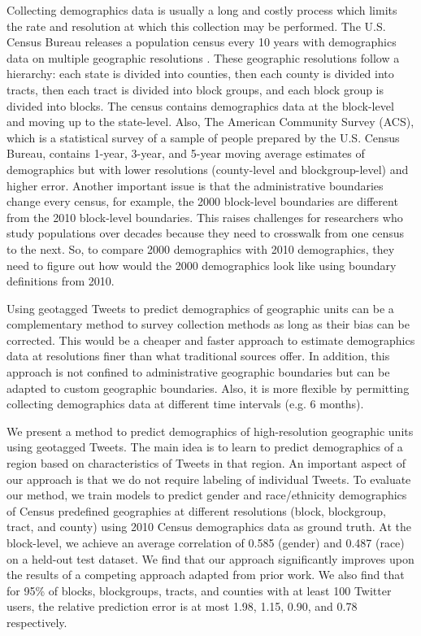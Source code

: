 \documentclass[letterpaper]{article}
\begin{document}
Collecting demographics data is usually a long and costly process which limits the rate and resolution at which this collection may be performed. The U.S. Census Bureau releases a population census every 10 years with demographics data on multiple geographic resolutions \cite{census2010}. These geographic resolutions follow a hierarchy: each state is divided into counties, then each county is divided into tracts, then each tract is divided into block groups, and each block group is divided into blocks. The census contains demographics data at the block-level and moving up to the state-level. Also, The American Community Survey (ACS), which is a statistical survey of a sample of people prepared by the U.S. Census Bureau, contains 1-year, 3-year, and 5-year moving average estimates of demographics but with lower resolutions (county-level and blockgroup-level) and higher error. Another important issue is that the administrative boundaries change every census, for example, the 2000 block-level boundaries are different from the 2010 block-level boundaries. This raises challenges for researchers who study populations over decades because they need to crosswalk from one census to the next. So, to compare 2000 demographics with 2010 demographics, they need to figure out how would the 2000 demographics look like using boundary definitions from 2010. 

Using geotagged Tweets to predict demographics of geographic units can be a complementary method to survey collection methods as long as their bias can be corrected. This would be a cheaper and faster approach to estimate demographics data at resolutions finer than what traditional sources offer. In addition, this approach is not confined to administrative geographic boundaries but can be adapted to custom geographic boundaries. Also, it is more flexible by permitting collecting demographics data at different time intervals (e.g. 6 months). 

We present a method to predict demographics of high-resolution geographic units using geotagged Tweets. The main idea is to learn to predict demographics of a region based on characteristics of Tweets in that region. An important aspect of our approach is that we do not require labeling of individual Tweets. To evaluate our method, we train models to predict gender and race/ethnicity demographics of Census predefined geographies at different resolutions (block, blockgroup, tract, and county) using 2010 Census demographics data as ground truth. At the block-level, we achieve an average correlation of 0.585 (gender) and 0.487 (race) on a held-out test dataset. We find that our approach significantly improves upon the results of a competing approach adapted from prior work. We also find that for 95\% of blocks, blockgroups, tracts, and counties with at least 100 Twitter users, the relative prediction error is at most 1.98, 1.15, 0.90, and 0.78 respectively.
 
\end{document}

